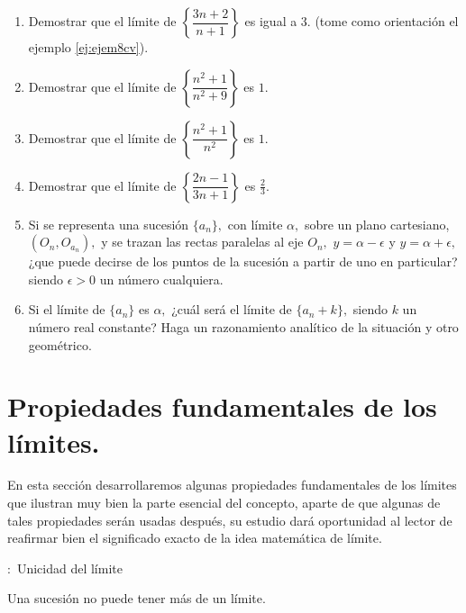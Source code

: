 \documentclass[oneside,english,spanish,2m,twoside,svgnames,x11names,HTML,twoside,12pt]{libro-matua}\usepackage[]{graphicx}\usepackage[]{color}
\begin{document}
\begin{ejercicios}[]
\begin{enumerate}
\item Demostrar que el límite de $\left\{ \dfrac{3n+2}{n+1}\right\} $ es
igual a $3.$ (tome como orientación el ejemplo \ref{ej:ejem8cv}).
\item Demostrar que el límite de $\left\{ \dfrac{n^{2}+1}{n^{2}+9}\right\} $
es $1.$
\item Demostrar que el límite de $\left\{ \dfrac{n^{2}+1}{n^{2}}\right\} $
es $1.$
\item Demostrar que el límite de $\left\{ \dfrac{2n-1}{3n+1}\right\} $
es $\frac{2}{3}.$
\item Si se representa una sucesión $\{a_{n}\},$ con límite $\alpha,$
sobre un plano cartesiano, $\left(O_{n},O_{a_{n}}\right),$ y se trazan
las rectas paralelas al eje $O_{n},$ $y=\alpha-\epsilon$ y $y=\alpha+\epsilon,$
¿que puede decirse de los puntos de la sucesión a partir de uno en
particular? siendo $\epsilon>0$ un número cualquiera.
\item Si el límite de $\{a_{n}\}$ es $\alpha,$ ¿cuál será el límite de
$\{a_{n}+k\},$ siendo $k$ un número real constante? Haga un razonamiento
analítico de la situación y otro geométrico. 
\end{enumerate}
\end{ejercicios}

\section{Propiedades fundamentales de los límites.}

En esta sección desarrollaremos algunas propiedades fundamentales
de los límites que ilustran muy bien la parte esencial del concepto,
aparte de que algunas de tales propiedades serán usadas después, su
estudio dará oportunidad al lector de reafirmar bien el significado
exacto de la idea matemática de límite.

\begin{propiedad}{:\ Unicidad del límite}

Una sucesión no puede tener más de un límite.

\end{propiedad}
\end{document}
